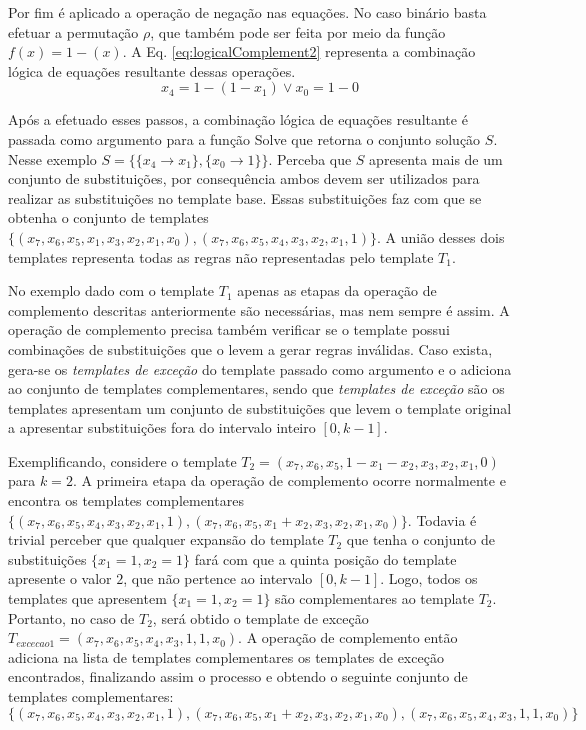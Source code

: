 Por fim é aplicado a operação de negação nas equações. No caso binário basta efetuar a permutação $\rho $, que também pode ser feita por meio da função $f(x) = 1 - (x)$. A Eq. \eqref{eq:logicalComplement2} representa a combinação lógica de equações resultante dessas operações.
\begin{equation}
x_4 = 1 - (1 - x_1) \vee  
x_0 = 1 - 0
\label{eq:logicalComplement2}
\end{equation}

Após a efetuado esses passos, a combinação lógica de equações resultante é passada como argumento para a função Solve que retorna o conjunto solução $S$. Nesse exemplo $S = \{\{x_4 \to x_1\},\{x_0\to 1\}\}$. Perceba que $S$ apresenta mais de um conjunto de substituições, por consequência ambos devem ser utilizados para realizar as substituições no template base. Essas substituições faz com que se obtenha o conjunto de templates $\{(x_7,x_6,x_5,x_1,x_3,x_2,x_1,x_0),(x_7,x_6,x_5,x_4,x_3,x_2,x_1,1)\}$. A união desses dois templates representa todas as regras não representadas pelo template $T_1$.

No exemplo dado com o template $T_1$ apenas as etapas da operação de complemento descritas anteriormente são necessárias, mas nem sempre é assim. 
A operação de complemento precisa também verificar se o template possui combinações de substituições que o levem a gerar regras inválidas. 
Caso exista, gera-se os \textit{templates de exceção} do template passado como argumento e o adiciona ao conjunto de templates complementares, sendo que \textit{templates de exceção} são os templates apresentam um conjunto de substituições que levem o template original a apresentar substituições fora do intervalo inteiro $[0, k-1]$.

Exemplificando, considere o template $T_2 = (x_7, x_6, x_5, 1 - x_1 - x_2, x_3, x_2, x_1, 0)$ para $k=2$.
A primeira etapa da operação de complemento ocorre normalmente e encontra os templates complementares $\{(x_7, x_6, x_5, x_4, x_3, x_2, x_1, 1),(x_7, x_6, x_5, x_1 + x_2, x_3, x_2, x_1, x_0)\}$.
Todavia é trivial perceber que qualquer expansão do template $T_2$ que tenha o conjunto de substituições $\{x_1 = 1, x_2 = 1\}$ fará com que a quinta posição do template apresente o valor $2$, que não pertence ao intervalo $[0,k-1]$.
Logo, todos os templates que apresentem $\{x_1 = 1, x_2 = 1\}$ são complementares ao template $T_2$.
Portanto, no caso de $T_2$, será obtido o template de exceção $T_{excecao 1} = (x_7, x_6, x_5, x_4, x_3, 1, 1, x_0)$. 
A operação de complemento então adiciona na lista de templates complementares os templates de exceção encontrados, finalizando assim o processo e obtendo o seguinte conjunto de templates complementares:
\begin{equation}
\{(x_7, x_6, x_5, x_4, x_3, x_2, x_1, 1),(x_7, x_6, x_5, x_1 + x_2, x_3, x_2, x_1, x_0),(x_7, x_6, x_5, x_4, x_3, 1, 1, x_0)\}
\label{eq:complementionSet}
\end{equation}

